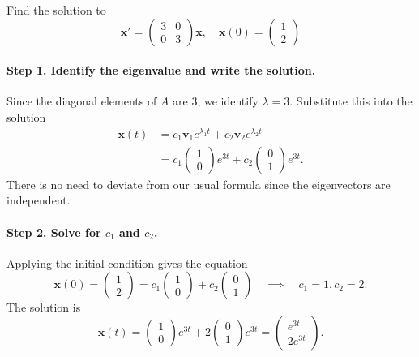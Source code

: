 \documentclass[11pt,letterpaper]{article}
\begin{document}

\begin{example}[1]{
Find the solution to 
\[
\mathbf{x}'=\begin{pmatrix}3&0\\0&3\end{pmatrix} \mathbf{x}, \quad \textbf{x}(0)=\begin{pmatrix}
    1\\2
\end{pmatrix}
\]
}
\paragraph{Step 1. Identify the eigenvalue and write the solution.}
    Since the diagonal elements of $A$ are $3$, we identify $\lambda=3$. Substitute this into the solution
\begin{align*}
\mathbf{x}(t) &= c_1 \mathbf{v}_1 e^{\lambda_1 t} + c_2 \mathbf{v}_2 e^{\lambda_2 t}\\
&=c_1 \begin{pmatrix}
    1\\0
\end{pmatrix} e^{3t} + c_2 \begin{pmatrix}
    0\\1
\end{pmatrix}e^{3t}.
\end{align*}
There is no need to deviate from our usual formula since the eigenvectors are independent.

\paragraph{Step 2. Solve for $c_1$ and $c_2$.} Applying the initial condition gives the equation 
$$
\textbf{x}(0)=\begin{pmatrix}
    1\\2
\end{pmatrix}=c_1 \begin{pmatrix}
    1\\0
\end{pmatrix} + c_2 \begin{pmatrix}
    0\\1
\end{pmatrix} \quad \implies \quad c_1=1, c_2=2.
$$
The solution is 
$$
\mathbf{x}(t) =\begin{pmatrix}
    1\\0
\end{pmatrix} e^{3t} +2 \begin{pmatrix}
    0\\1
\end{pmatrix}e^{3t} = \boxed{
\begin{pmatrix}
    e^{3t}\\2e^{3t}
\end{pmatrix}
}.
$$
\end{example}
\end{document}
